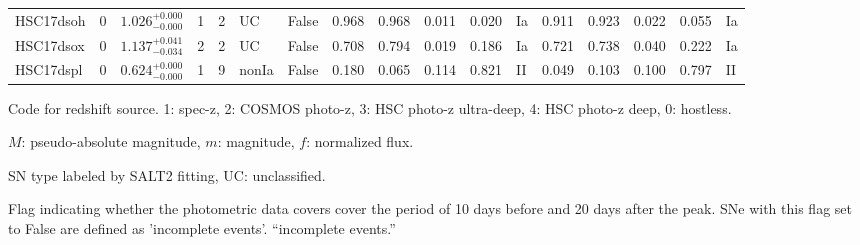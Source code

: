 \documentclass[proof]{pasj01}
\providecommand{\DIFadd}[1]{{\protect\color{blue} \sf #1}} %
\providecommand{\DIFdel}[1]{{\protect\color{red} \scriptsize #1}} %
\providecommand{\DIFaddFL}[1]{\DIFadd{#1}} %
\providecommand{\DIFdelFL}[1]{\DIFdel{#1}} %
\providecommand{\DIFaddbeginFL}{} %
\providecommand{\DIFaddendFL}{} %
\providecommand{\DIFdelbeginFL}{} %
\providecommand{\DIFdelendFL}{} %
\newcommand{\DIFscaledelfig}{0.5}
\newlength{\DIFdelgraphicswidth} %
\newlength{\DIFdelgraphicsheight} %
\newcommand{\DIFaddincludegraphics}[2][]{{\color{blue}\fbox{\DIFOincludegraphics[#1]{#2}}}} %
\newcommand{\DIFdelincludegraphics}[2][]{%
\sbox{\DIFdelgraphicsbox}{\DIFOincludegraphics[#1]{#2}}%
\settoboxwidth{\DIFdelgraphicswidth}{\DIFdelgraphicsbox} %
\settoboxtotalheight{\DIFdelgraphicsheight}{\DIFdelgraphicsbox} %
\scalebox{\DIFscaledelfig}{%
\parbox[b]{\DIFdelgraphicswidth}{\usebox{\DIFdelgraphicsbox}\\[-\baselineskip] \rule{\DIFdelgraphicswidth}{0em}}\llap{\resizebox{\DIFdelgraphicswidth}{\DIFdelgraphicsheight}{%
\setlength{\unitlength}{\DIFdelgraphicswidth}%
\begin{picture}(1,1)%
\thicklines\linethickness{2pt} %
{\color[rgb]{1,0,0}\put(0,0){\framebox(1,1){}}}%
{\color[rgb]{1,0,0}\put(0,0){\line( 1,1){1}}}%
{\color[rgb]{1,0,0}\put(0,1){\line(1,-1){1}}}%
\end{picture}%
}\hspace*{3pt}}} %
} %
\DeclareRobustCommand{\DIFaddbeginFL}{\DIFOaddbeginFL \let\includegraphics\DIFaddincludegraphics} %
\DeclareRobustCommand{\DIFaddendFL}{\DIFOaddendFL \let\includegraphics\DIFOincludegraphics} %
\DeclareRobustCommand{\DIFdelbeginFL}{\DIFOdelbeginFL \let\includegraphics\DIFdelincludegraphics} %
\DeclareRobustCommand{\DIFdelendFL}{\DIFOaddendFL \let\includegraphics\DIFOincludegraphics} %
\begin{document}
\begin{table}[htbp]
{\begin{tabular}{p{4.5em}p{1.2em}p{4.0em}p{2.1em}|p{0.6em}p{1.8em}p{3.0em}|p{2.9em}|p{1.2em}p{1.2em}p{1.2em}p{0.6em}|p{2.9em}|p{1.2em}p{1.2em}p{1.2em}p{0.6em}}
HSC17dsoh &     0 &    $1.026_{-0.000}^{+0.000}$ &         1 &    2 &  UC &   False &    0.968 &    0.968 &    0.011 &    0.020 &      Ia &    0.911 &    0.923 &    0.022 &    0.055 &      Ia \\
HSC17dsox &     0 &    $1.137_{-0.034}^{+0.041}$ &         2 &    2 &  UC &   False &    0.708 &    0.794 &    0.019 &    0.186 &      Ia &    0.721 &    0.738 &    0.040 &    0.222 &      Ia \\
HSC17dspl &     0 &    $0.624_{-0.000}^{+0.000}$ &         1 &    9 &  nonIa &   False &    0.180 &    0.065 &    0.114 &    0.821 &      II &    0.049 &    0.103 &    0.100 &    0.797 &      II \\
\hline
\end{tabular}
}\label{tab:h_results}
\begin{tabnote}
\footnotemark[$*$] Code for redshift source.
1: spec-z, 2: COSMOS photo-z, 3: HSC photo-z ultra-deep, 4: HSC photo-z deep, 0: hostless.

\footnotemark[$\dagger$] $M$: pseudo-absolute magnitude, $m$: magnitude, $f$: normalized flux.

\footnotemark[$\ddagger$] SN type labeled by SALT2 fitting, UC: unclassified.

\footnotemark[$\S$] Flag indicating whether the photometric data \DIFdelbeginFL \DIFdelFL{covers }\DIFdelendFL \DIFaddbeginFL \DIFaddFL{cover }\DIFaddendFL the period of 10 days before and 20 days after the peak. SNe with this flag set to False are defined as \DIFdelbeginFL \DIFdelFL{'incomplete events'.}\DIFdelendFL \DIFaddbeginFL \DIFaddFL{``incomplete events.''
}\DIFaddendFL \end{tabnote}
\end{table}
%
%
\end{document}
